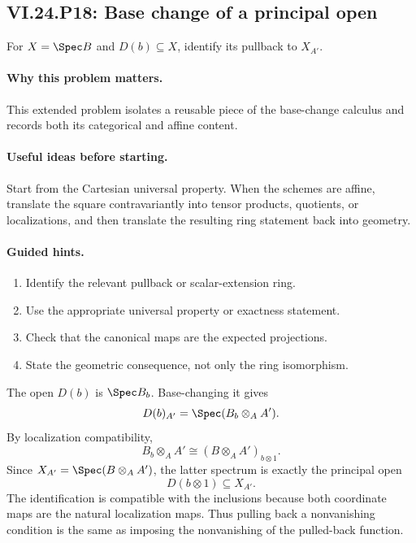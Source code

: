\subsection*{VI.24.P18: Base change of a principal open}
\begin{problem}\label{prob:vi24-p18}
For $X=\Spec B$ and $D(b)\subseteq X$, identify its pullback to $X_{A'}$.
\end{problem}

\ifdefined\FullProblemDossiers
\paragraph{Why this problem matters.}
This extended problem isolates a reusable piece of the base-change calculus and records both its categorical and affine content.

\paragraph{Useful ideas before starting.}
Start from the Cartesian universal property.  When the schemes are affine, translate the square contravariantly into tensor products, quotients, or localizations, and then translate the resulting ring statement back into geometry.

\paragraph{Guided hints.}
\begin{enumerate}
\item Identify the relevant pullback or scalar-extension ring.
\item Use the appropriate universal property or exactness statement.
\item Check that the canonical maps are the expected projections.
\item State the geometric consequence, not only the ring isomorphism.
\end{enumerate}

\begin{solution}
The open $D(b)$ is $\Spec B_b$.  Base-changing it gives
\[
D(b)_{A'}=\Spec(B_b\otimes_AA').
\]
By localization compatibility,
\[
B_b\otimes_AA'\cong(B\otimes_AA')_{b\otimes1}.
\]
Since $X_{A'}=\Spec(B\otimes_AA')$, the latter spectrum is exactly the principal open
\[
D(b\otimes1)\subseteq X_{A'}.
\]
The identification is compatible with the inclusions because both coordinate maps are the natural localization maps.  Thus pulling back a nonvanishing condition is the same as imposing the nonvanishing of the pulled-back function.
\end{solution}

